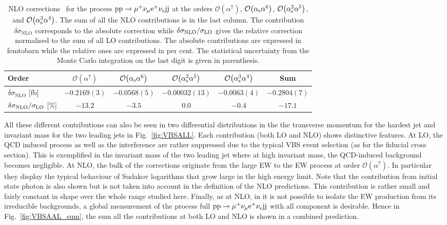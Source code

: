 \begin{table}
\begin{center}
\begin{tabular}{|l||c|c|c|c||c|}
\hline
Order & $\mathcal{O}{\left(\alpha^{7}\right)}$ & $\mathcal{O}{\left(\alpha_{\rm s}\alpha^{6}\right)}$ & $\mathcal{O}{\left(\alpha_{\rm s}^{2}\alpha^{5}\right)}$ & $\mathcal{O}{\left(\alpha_{\rm s}^{3}\alpha^{4}\right)}$ & Sum \\
\hline
\hline 
${\delta \sigma_{\mathrm{NLO}}}$ [fb] 
& $-0.2169(3)$ 
& $-0.0568(5)$
& $-0.00032(13)$
& $-0.0063(4)$ 
& $-0.2804(7)$ \\
\hline
$\delta \sigma_{\mathrm{NLO}}/\sigma_{\rm LO}$ [\%] & $-13.2$ & $-3.5$ & $0.0$ & $-0.4$ & $-17.1$ \\
\hline
\end{tabular}
\end{center}
\caption{
NLO corrections~\cite{Biedermann:2017bss} for the process ${\rm p}{\rm p}\to\mu^+\nu_\mu{\rm e}^+\nu_{\rm e}{\rm j}{\rm j}$ at the orders 
$\mathcal{O}{\left(\alpha^{7}\right)}$, $\mathcal{O}{\left(\alpha_{\rm s}\alpha^{6}\right)}$, $\mathcal{O}{\left(\alpha_{\rm s}^{2}\alpha^{5}\right)}$, and $\mathcal{O}{\left(\alpha_{\rm s}^{3}\alpha^{4}\right)}$.
The sum of all the NLO contributions is in the last column.
The contribution $\delta\sigma_{\mathrm{NLO}}$ corresponds to the absolute correction while $\delta \sigma_{\mathrm{NLO}}/\sigma_{\rm LO}$ gives the relative correction normalised to the sum of all LO contributions.
The absolute contributions are expressed in femtobarn while the relative ones are expressed in per cent.
The statistical uncertainty from the Monte Carlo integration on the last digit is given in parenthesis.}
\label{table:NLOVBS}
\end{table}

All these different contributions can also be seen in two differential distributions in the the transverse momentum for the hardest jet and invariant mass for the two leading jets in Fig.~\ref{fig:VBSALL}.
Each contribution (both LO and NLO) shows distinctive features.
At LO, the QCD induced process as well as the interference are rather suppressed due to the typical VBS event selection (as for the fiducial cross section).
This is exemplified in the invariant mass of the two leading jet where at high invariant mass, the QCD-induced background becomes negligible.
At NLO, the bulk of the corrections originate from the large EW to the EW process at order $\mathcal{O}{\left(\alpha^{7}\right)}$.
In particular they display the typical behaviour of Sudakov logarithms that grow large in the high energy limit.
Note that the contribution from initial state photon is also shown but is not taken into account in the definition of the NLO predictions.
This contribution is rather small and fairly constant in shape over the whole range studied here.
Finally, as at NLO, in it is not possible to isolate the EW production from its irreducible backgrounds, a global measurement of the process full ${\rm p}{\rm p}\to\mu^+\nu_\mu{\rm e}^+\nu_{\rm e}{\rm j}{\rm j}$ with all component is desirable.
Hence in Fig.~\ref{fig:VBSAAL_sum}, the sum all the contributions at both LO and NLO is shown in a combined prediction.

